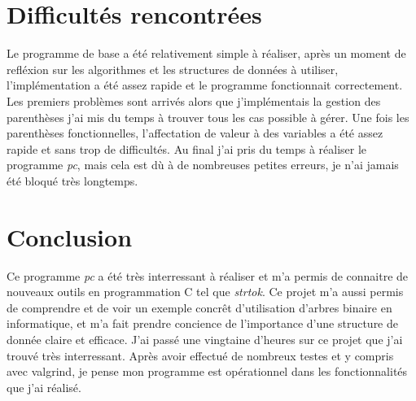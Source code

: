 \documentclass[a4paper,11pt,DIV=11]{scrartcl}
\begin{document}
\begin{onehalfspace}
    \section*{Difficultés rencontrées}

    Le programme de base a été relativement simple à réaliser, après un moment de refléxion sur les algorithmes
    et les structures de données à utiliser, l'implémentation a été assez rapide et le programme fonctionnait
    correctement. Les premiers problèmes sont arrivés alors que j'implémentais la gestion des parenthèses
    j'ai mis du temps à trouver tous les cas possible à gérer. Une fois les parenthèses fonctionnelles,
    l'affectation de valeur à des variables a été assez rapide et sans trop de difficultés. Au final j'ai
    pris du temps à réaliser le programme \emph{pc}, mais cela est dù à de nombreuses petites erreurs, je
    n'ai jamais été bloqué très longtemps.


    \section*{Conclusion}

    Ce programme \emph{pc} a été très interressant à réaliser et m'a permis de connaitre de nouveaux outils
    en programmation C tel que \emph{strtok}. Ce projet m'a aussi permis de comprendre et de voir un exemple
    concrêt d'utilisation d'arbres binaire en informatique, et m'a fait prendre concience de l'importance
    d'une structure de donnée claire et efficace. J'ai passé une vingtaine d'heures sur ce projet que j'ai
    trouvé très interressant. Après avoir effectué de nombreux testes et y compris avec valgrind, je pense
    mon programme est opérationnel dans les fonctionnalités que j'ai réalisé.


\end{onehalfspace}
\end{document}
